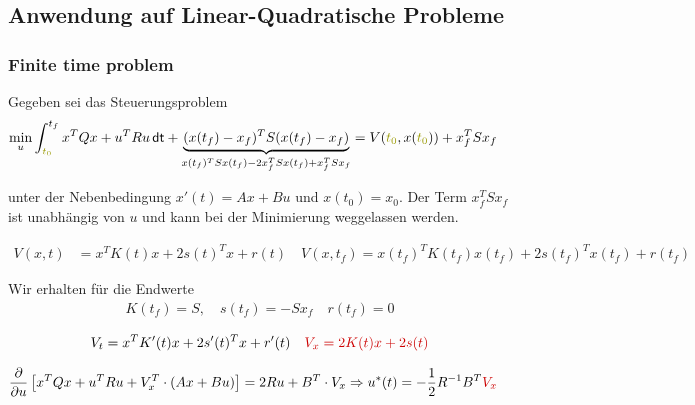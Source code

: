 \documentclass[a4paper, 12pt]{scrartcl}
\newcommand{\rot}[2][rot]{\textcolor{#1}{#2}}
\newcommand{\dunkelgelb}[2][dunkelgelb]{\textcolor{#1}{#2}}
\newcommand{\dt}{\thinspace \mathsf{dt}}
\begin{document}
\subsection{Anwendung auf Linear-Quadratische Probleme}

\subsubsection{Finite time problem}

Gegeben sei das Steuerungsproblem 
%
\begin{align*}
    \min_u &  \int_{\dunkelgelb{t_0}}^{t_f} x^T Q x + u^T R u \dt + \underbrace{(x(t_f)- x_f)^T S (x(t_f)- x_f)}_{x(t_f)^T S x(t_f) -2x_{f}^T S x(t_f) +x_{f}^{T} S x_f} 
    = V(\dunkelgelb{t_0},x(\dunkelgelb{t_0})) + x_{f}^{T} S x_f
\end{align*}

unter der Nebenbedingung $x'(t) = Ax+Bu$ und $x(t_0) = x_0$. Der Term $x_{f}^{T} S x_f$ ist unabhängig von $u$ und kann bei der Minimierung weggelassen werden.

%
\begin{align*}
V(x,t) 	&= x^T K(t) x + 2 s(t)^T x +r(t) \quad V(x,t_f) = x(t_f)^T K(t_f) x(t_f) + 2 s(t_f)^T x(t_f) + r(t_f)
\end{align*}

Wir erhalten für die Endwerte
%
\begin{align*}
K(t_f) = S, \quad s(t_f) = - S x_f \quad r(t_f) = 0
\end{align*}

%
\begin{align*}
V_t = x^T K'(t) x + 2 s'(t)^T x +r'(t) \quad \rot{V_x = 2K(t)x +2s(t)} 
\end{align*}


%
\begin{align*}
\frac{\partial}{\partial u} \left[ x^T Q x + u^T R u + V_x^T \cdot (Ax+Bu) \right] &= 2Ru + B^T \cdot V_x \Rightarrow u^{*}(t) = - \frac{1}{2} R^{-1} B^T \rot{V_x}
\end{align*}
\end{document}
